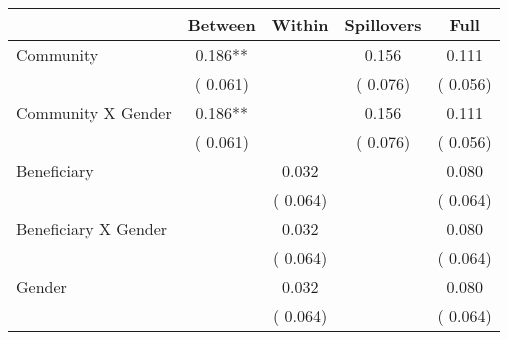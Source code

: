 
\begin{tabular}{l*{4}{c}}\hline&\multicolumn{1}{c}{Between}&\multicolumn{1}{c}{Within}&\multicolumn{1}{c}{Spillovers}&\multicolumn{1}{c}{Full}\\ \hline
 Community                                     &              0.186**      &                                               &        0.156 &         0.111                            \\ 
                                                       &        (       0.061)           &                                       &       (       0.076)     &      (       0.056)                                           \\ 
 Community X Gender            &              0.186**      &                                               &        0.156 &         0.111                            \\ 
                                                       &        (       0.061)           &                                       &       (       0.076)     &      (       0.056)                                           \\ 
 Beneficiary                           &                                               &        0.032    &                                &             0.080                            \\ 
                                                       &                                               & (       0.064)                  &                                        &      (       0.064)                                           \\ 
 Beneficiary X Gender          &                                               &        0.032    &                                &             0.080                            \\ 
                                                       &                                               & (       0.064)                  &                                        &      (       0.064)                                           \\ 
 Gender                                        &                              &        0.032    &                                &             0.080                            \\ 
                                                       &                                               & (       0.064)                  &                                        &      (       0.064)                                           \\ 

\end{tabular}
